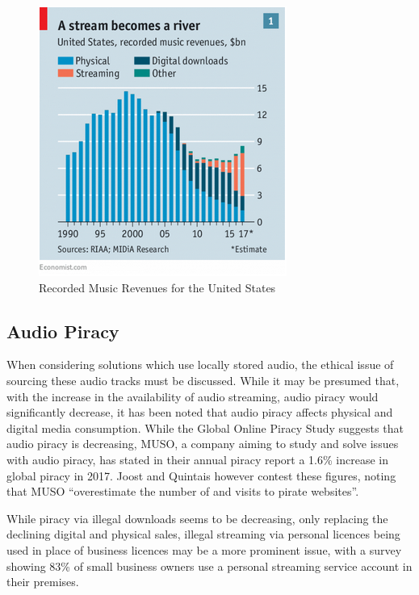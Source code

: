 \documentclass[11pt,a4paper,headinclude=false,footinclude=false]{scrreprt}
\begin{document}
\begin{figure}[H]
\includegraphics{Ethics/StreamBecomesRiver.png}
\centering
\caption{Recorded Music Revenues for the United States \cite{SpotPay18}}
\label{StreamBecomesRiver}
\end{figure}

\subsection{Audio Piracy}\label{audio-piracy}

When considering solutions which use locally stored audio, the ethical
issue of sourcing these audio tracks must be discussed. While it may be
presumed that, with the increase in the availability of audio streaming,
audio piracy would significantly decrease, it has been noted that audio
piracy affects physical and digital media
consumption\cite{onlinePiracy}. While the Global Online Piracy
Study\cite{onlinePiracy} suggests that audio piracy is decreasing, MUSO,
a company aiming to study and solve issues with audio piracy, has stated
in their annual piracy report a 1.6\% increase in global piracy in
2017\cite{muso}. Joost and Quintais however contest these figures,
noting that MUSO ``overestimate the number of and visits to pirate
websites''\cite{onlinePiracy}.

While piracy via illegal downloads seems to be decreasing, only
replacing the declining digital and physical sales\cite{SpotPay18},
illegal streaming via personal licences being used in place of business
licences may be a more prominent issue, with a survey showing 83\% of
small business owners use a personal streaming service account in their
premises\cite{licence}.
\end{document}
